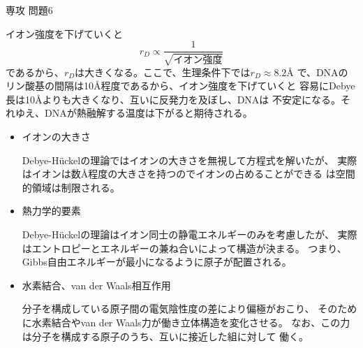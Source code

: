 \documentclass[fleqn]{jbook}
\begin{document}
\begin{answer}{専攻 問題6}{}
\begin{subanswers}
\SubAnswer
イオン強度を下げていくと
\[ r_D \propto \frac{1}{\sqrt{イオン強度}} \]
であるから、$r_D$は大きくなる。ここで、生理条件下では$r_D \approx 8.2$\AA
で、DNAのリン酸基の間隔は10\AA 程度であるから、イオン強度を下げていくと
容易にDebye長は10\AA よりも大きくなり、互いに反発力を及ぼし、DNAは
不安定になる。それゆえ、DNAが熱融解する温度は下がると期待される。

\SubAnswer
\begin{itemize}
\item{イオンの大きさ}

Debye-H\"uckelの理論ではイオンの大きさを無視して方程式を解いたが、
実際はイオンは数\AA 程度の大きさを持つのでイオンの占めることができる
は空間的領域は制限される。

\item{熱力学的要素}

Debye-H\"uckelの理論はイオン同士の静電エネルギーのみを考慮したが、
実際はエントロピーとエネルギーの兼ね合いによって構造が決まる。
つまり、Gibbs自由エネルギーが最小になるように原子が配置される。

\item{水素結合、van der Waals相互作用}

分子を構成している原子間の電気陰性度の差により偏極がおこり、
そのために水素結合やvan der Waals力が働き立体構造を変化させる。
なお、この力は分子を構成する原子のうち、互いに接近した組に対して
働く。

\end{itemize}


\end{subanswers}
\end{answer}
\end{document}
